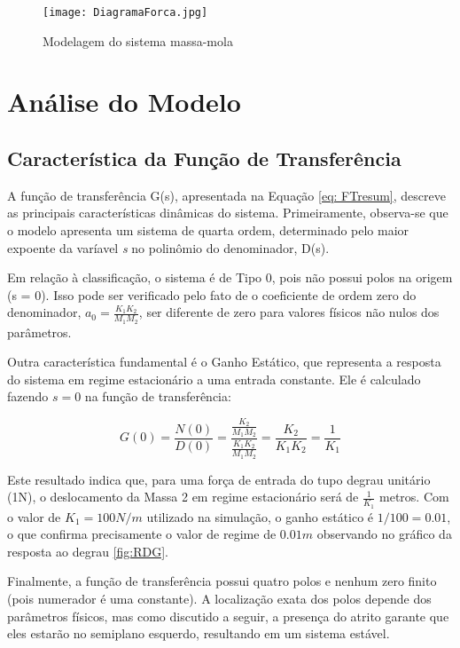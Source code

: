 \documentclass[9pt,a4paper,twocolumn,twoside]{tau-class/tau}
\begin{document}
\begin{figure}[H]
    \centering
    \texttt{[image: DiagramaForca.jpg]}
    \caption{Modelagem do sistema massa-mola}
    \label{fig:MSM}
\end{figure}


\section{Análise do Modelo}

\subsection{Característica da Função de Transferência}
A função de transferência G(s), apresentada na Equação \ref{eq: FTresum}, descreve as principais características dinâmicas do sistema. Primeiramente, observa-se que o modelo apresenta um sistema de quarta ordem, determinado pelo maior expoente da varíavel \textit{s} no polinômio do denominador, D(s).

Em relação à classificação, o sistema é de Tipo 0, pois não possui polos na origem (s = 0). Isso pode ser verificado pelo fato de o coeficiente de ordem zero do denominador, $a_0 = \frac{K_1K_2}{M_1M_2}$, ser diferente de zero para valores físicos não nulos dos parâmetros.

Outra característica fundamental é o Ganho Estático, que representa a resposta do sistema em regime estacionário a uma entrada constante. Ele é calculado fazendo $s = 0$ na função de transferência:

\begin{equation}
    G(0) = \frac{N(0)}{D(0)} = \frac{\frac{K_2}{M_1M_2}}{\frac{K_1K_2}{M_1M_2}} = \frac{K_2}{K_1K_2} = \frac{1}{K_1}
    \label{GE}
\end{equation}

Este resultado indica que, para uma força de entrada do tupo degrau unitário (1N), o deslocamento da Massa 2 em regime estacionário será de $\frac{1}{K_1}$ metros. Com o valor de $K_1 = 100 N/m$ utilizado na simulação, o ganho estático é $1/100 = 0.01$, o que confirma precisamente o valor de regime de $0.01 m$ observando no gráfico da resposta ao degrau \ref{fig:RDG}.

Finalmente, a função de transferência possui quatro polos e nenhum zero finito (pois numerador é uma constante). A localização exata dos polos depende dos parâmetros físicos, mas como discutido a seguir, a presença do atrito garante que eles estarão no semiplano esquerdo, resultando em um sistema estável.
\end{document}
